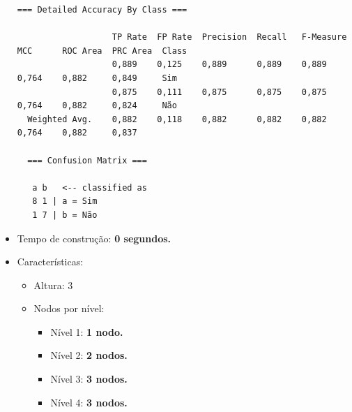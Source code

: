 \documentclass[
    article,            %
    11pt,               %
    oneside,            %
    a4paper,            %
    english,            %
    brazil,             %
    sumario=tradicional,
    ]{abntex2}
\begin{document}
\begin{itemize}
\begin{Verbatim}[frame=single, fontsize=\tiny]
  === Detailed Accuracy By Class ===

                   TP Rate  FP Rate  Precision  Recall   F-Measure  MCC      ROC Area  PRC Area  Class
                   0,889    0,125    0,889      0,889    0,889      0,764    0,882     0,849     Sim
                   0,875    0,111    0,875      0,875    0,875      0,764    0,882     0,824     Não
  Weighted Avg.    0,882    0,118    0,882      0,882    0,882      0,764    0,882     0,837     

  === Confusion Matrix ===

   a b   <-- classified as
   8 1 | a = Sim
   1 7 | b = Não
  \end{Verbatim}
  \item Tempo de construção: \textbf{0 segundos.}
  \item Características:
  \begin{itemize}
    \item Altura: 3
    \item Nodos por nível:
    \begin{itemize}
      \item Nível 1: \textbf{1 nodo.}
      \item Nível 2: \textbf{2 nodos.}
      \item Nível 3: \textbf{3 nodos.}
      \item Nível 4: \textbf{3 nodos.}
    \end{itemize}
  \end{itemize}
\end{itemize} 
\end{document}
